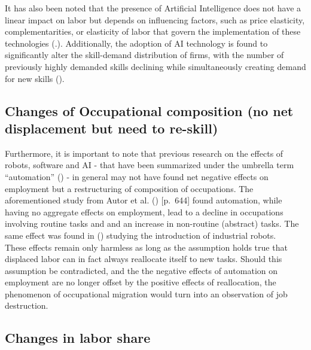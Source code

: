 \documentclass[
  11,
  a4paperpaper,
]{article}
\begin{document}
It has also been noted that the presence of Artificial Intelligence does
not have a linear impact on labor but depends on influencing factors,
such as price elasticity, complementarities, or elasticity of labor that
govern the implementation of these technologies
(.). Additionally, the adoption of AI technology is found to
significantly alter the skill-demand distribution of firms, with the
number of previously highly demanded skills declining while
simultaneously creating demand for new skills
().

\subsection{Changes of Occupational composition (no net displacement but
need to
re-skill)}\label{changes-of-occupational-composition-no-net-displacement-but-need-to-re-skill}

Furthermore, it is important to note that previous research on the
effects of robots, software and AI - that have been summarized under the
umbrella term ``automation'' () - in general may not have found net negative
effects on employment but a restructuring of composition of occupations.
The aforementioned study from Autor et al.
() {[}p.~644{]} found
automation, while having no aggregate effects on employment, lead to a
decline in occupations involving routine tasks and and an increase in
non-routine (abstract) tasks. The same effect was found in
()
studying the introduction of industrial robots.\\
These effects remain only harmless as long as the assumption holds true
that displaced labor can in fact always reallocate itself to new tasks.
Should this assumption be contradicted, and the the negative effects of
automation on employment are no longer offset by the positive effects of
reallocation, the phenomenon of occupational migration would turn into
an observation of job destruction.

\subsection{Changes in labor share}\label{changes-in-labor-share}
\end{document}

